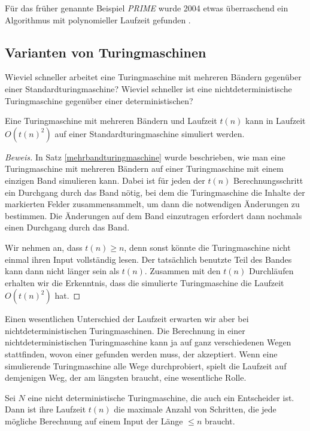 \begin{beispiel}
Für das früher genannte Beispiel \textsl{PRIME} wurde 2004 etwas
überraschend ein Algorithmus mit
polynomieller Laufzeit gefunden \cite{skript:aks}.
\end{beispiel}

\subsection{Varianten von Turingmaschinen}
Wieviel schneller arbeitet eine Turingmaschine mit mehreren Bändern 
gegenüber einer Standardturingmaschine? Wieviel schneller ist eine
nichtdeterministische Turingmaschine gegenüber einer deterministischen?

\begin{satz}
%
Eine Turingmaschine mit mehreren Bändern und Laufzeit $t(n)$ kann
in Laufzeit $O(t(n)^2)$ auf einer Standardturingmaschine
simuliert werden.
\end{satz}

\begin{proof}[Beweis]
In Satz \ref{mehrbandturingmaschine} wurde beschrieben, wie man eine
Turingmaschine mit mehreren Bändern auf einer Turingmaschine mit
einem einzigen Band simulieren kann. Dabei ist für jeden der
$t(n)$ Berechnungsschritt ein Durchgang durch das Band nötig, bei
dem die Turingmaschine die Inhalte der markierten Felder zusammensammelt,
um dann die notwendigen Änderungen zu bestimmen. Die Änderungen
auf dem Band einzutragen erfordert dann nochmals einen Durchgang
durch das Band.

Wir nehmen an, dass $t(n)\ge n$, denn sonst könnte die
Turingmaschine nicht einmal ihren Input vollständig lesen.
Der tatsächlich benutzte Teil des Bandes kann dann nicht länger sein
als $t(n)$. Zusammen mit den $t(n)$ Durchläufen erhalten wir
die Erkenntnis,
dass die simulierte Turingmaschine die Laufzeit $O(t(n)^2)$ hat.
\end{proof}

Einen wesentlichen Unterschied der Laufzeit erwarten wir aber
bei nichtdeterministischen Turingmaschinen.
Die Berechnung in einer nichtdeterministischen Turingmaschine
kann ja auf ganz verschiedenen Wegen stattfinden, wovon
einer gefunden werden muss, der akzeptiert. Wenn eine simulierende
Turingmaschine alle Wege durchprobiert, spielt die Laufzeit auf
demjenigen Weg, der am längsten braucht, eine wesentliche Rolle.

\begin{definition}
%
Sei $N$ eine nicht deterministische Turingmaschine, die auch ein
Entscheider ist. Dann ist ihre Laufzeit $t(n)$ die maximale Anzahl
von Schritten, die jede mögliche Berechnung auf einem Input der
Länge $\le n$ braucht.
\end{definition}

